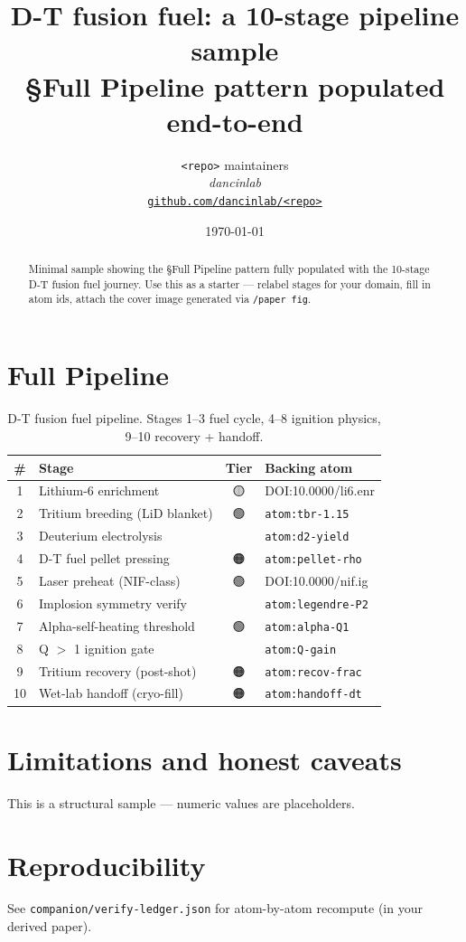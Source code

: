 \documentclass[11pt,a4paper]{article}
\title{\textbf{D-T fusion fuel: a 10-stage pipeline sample}\\[2pt]\large §Full Pipeline pattern populated end-to-end}
\author{\texttt{<repo>} maintainers\\\normalsize\textit{dancinlab}\\[2pt]\normalsize\href{https://github.com/dancinlab/<repo>}{\texttt{github.com/dancinlab/<repo>}}}
\date{\today}
\providecommand{\tierBlue}{🔵}
\providecommand{\tierGreen}{🟢}
\providecommand{\tierYellow}{🟡}
\providecommand{\tierOrange}{🟠}
\begin{document}
\maketitle
\begin{abstract}
Minimal sample showing the §Full Pipeline pattern fully populated with the 10-stage D-T fusion fuel journey. Use this as a starter — relabel stages for your domain, fill in atom ids, attach the cover image generated via \texttt{/paper fig}.
\end{abstract}
\section{Full Pipeline}
\begin{table}[h]\centering\small
\begin{tabular}{@{}clcl@{}}
\toprule
\textbf{\#} & \textbf{Stage} & \textbf{Tier} & \textbf{Backing atom} \\
\midrule
1 & Lithium-6 enrichment            & \tierYellow & DOI:10.0000/li6.enr \\
2 & Tritium breeding (LiD blanket)  & \tierGreen  & \texttt{atom:tbr-1.15} \\
3 & Deuterium electrolysis          & \tierBlue   & \texttt{atom:d2-yield} \\
4 & D-T fuel pellet pressing        & \tierOrange & \texttt{atom:pellet-rho} \\
5 & Laser preheat (NIF-class)       & \tierGreen  & DOI:10.0000/nif.ig \\
6 & Implosion symmetry verify       & \tierBlue   & \texttt{atom:legendre-P2} \\
7 & Alpha-self-heating threshold    & \tierGreen  & \texttt{atom:alpha-Q1} \\
8 & Q $>$ 1 ignition gate           & \tierBlue   & \texttt{atom:Q-gain} \\
9 & Tritium recovery (post-shot)    & \tierOrange & \texttt{atom:recov-frac} \\
10 & Wet-lab handoff (cryo-fill)    & \tierOrange & \texttt{atom:handoff-dt} \\
\bottomrule
\end{tabular}
\caption{D-T fusion fuel pipeline. Stages 1--3 fuel cycle, 4--8 ignition physics, 9--10 recovery + handoff.}
\end{table}
\section{Limitations and honest caveats}
This is a structural sample — numeric values are placeholders.
\section{Reproducibility}
See \texttt{companion/verify-ledger.json} for atom-by-atom recompute (in your derived paper).
\end{document}
